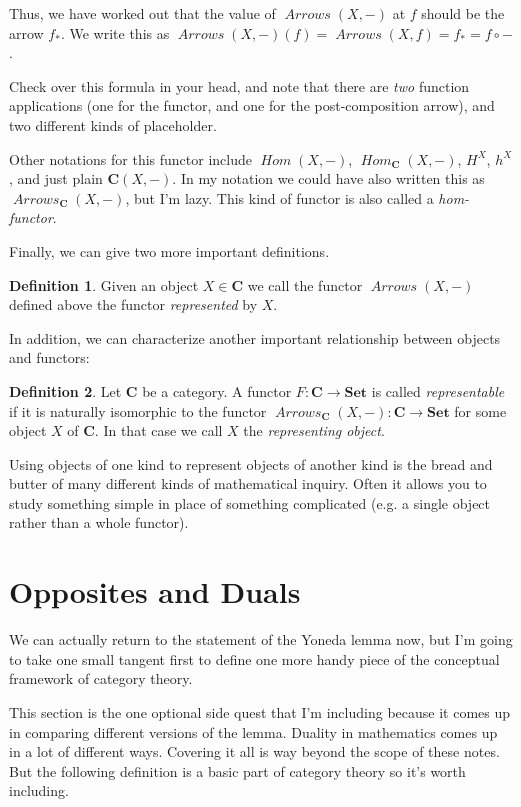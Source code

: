 \documentclass[12pt]{article}
\theoremstyle{definition}
\theoremstyle{definition}
\newtheorem{defn}{Definition}[]
\theoremstyle{definition}
\numberwithin{equation}{section}
\newcommand{\cat}[1]{\mathbf{#1}}      %
\newcommand{\fcat}[1]{{\mathbf {#1}}}    %
\newcommand{\CC}{\cat{C}}
\DeclareMathOperator{\Arrows}{\mathit{Arrows}}
\DeclareMathOperator{\Hom}{\mathit{Hom}}
\newcommand{\Set}{\fcat{Set}}           %
\def\ni{\goodbreak\noindent}
\begin{document}
Thus, we have worked out that the value of $\Arrows(X,-)$ at $f$ should be the arrow $f_*$.
We write this as
$\Arrows(X,-)(f) = \Arrows(X,f) = f_* = f \circ -$.

Check over this formula in your head, and note that 
there are {\it two} function applications (one for the functor, and one for the post-composition arrow), 
and two different kinds of placeholder.

Other notations for this functor include $\Hom(X, -)$, $\Hom_\CC(X,
-)$, $H^X$, $h^X$, and just plain $\CC(X,-)$. 
In my notation we could have also written this as
$\Arrows_{\CC}(X, -)$, but I'm lazy. This kind of functor is also called a {\it hom-functor}.

Finally, we can give two more important definitions.
\begin{defn}
Given an object $X \in \CC$ we call the functor $\Arrows(X,-)$ defined above the functor {\it represented} by $X$.
\end{defn}
\ni
In addition, we can characterize another important relationship between
objects and functors:

\begin{defn}
 Let $\cat{C}$ be a category. A functor $F:\cat{C}\to\Set$ is called \emph{representable}
 if it is naturally isomorphic to the functor $\Arrows_\cat{C}(X,-):\cat{C}\to\Set$ for some
 object $X$ of $\cat{C}$. In that case we call $X$ the \emph{representing object}. 
\end{defn}
\ni
Using objects of one kind to represent objects of another kind is the bread and butter of many
different kinds of mathematical inquiry. Often it allows  you to study something simple in place
of something complicated (e.g. a single object rather than a whole functor).

\section{Opposites and Duals}

We can actually return to the statement of the Yoneda lemma now, but 
I'm going to take one small tangent first to define one more handy piece of
the conceptual framework of category theory.

This section is the one optional side quest that I'm including because it comes up in
comparing different versions of the lemma. Duality in mathematics comes up in a lot of
different ways. Covering it all is way beyond the scope of these notes. But the following
definition is a basic part of category theory so it's worth including.
\end{document}
